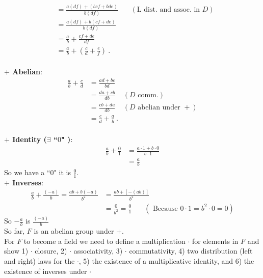 \begin{theorem}
\begin{align}
        &= \frac{a(df)+(bcf+bde)}{b(df)} \ \ \ \ \ \  \ \ (\text{L dist. and assoc. in }D) \nonumber \\
        &= \frac{a(df)+b(cf+de)}{b(df)} \nonumber \\
        &= \frac{a}{b} + \frac{cf+de}{df} \nonumber \\
        &= \frac{a}{b}+\left(\frac{c}{d}+\frac{e}{f}\right) \ . \nonumber
    \end{align}\\
    \newpage 
    \noindent \textbf{$+$ Abelian}: \\
    \begin{align}
        \frac{a}{b}+\frac{c}{d}&= \frac{ad+bc}{bd}\nonumber \\
        &= \frac{da+cb}{db} \ \ \ \ \ (D \text{ comm.}) \nonumber \\
        &= \frac{cb+da}{db} \ \ \ \ \ (D \text{ abelian under }+) \nonumber \\
        &= \frac{c}{d}+\frac{a}{b} \ . \nonumber
    \end{align}\\
    \noindent \textbf{$+$ Identity ($\exists$ ``$0$" )}: \\
    \begin{align}
        \frac{a}{b}+\frac{0}{1} &= \frac{a\cdot 1 + b\cdot 0}{b\cdot 1} \nonumber \\
        &= \frac{a}{b} \nonumber
    \end{align}
    So we have a ``$0$" it is $\frac{0}{1}$.\\
    \noindent \textbf{$+$ Inverses}: \\
    \begin{align}
        \frac{a}{b}+\frac{(-a)}{b} = \frac{ab+b(-a)}{b^2} &= \frac{ab+[-(ab)]}{b^2} \nonumber \\
        &= \frac{0}{b^2} = \frac{0}{1} \ \ \ \ \ \ \ \ (\text{ Because }0\cdot 1 = b^2 \cdot 0 = 0) \nonumber
    \end{align}
    So $-\frac{a}{b}$ is $\frac{(-a)}{b}$
    \steezybreak \\
    So far, $F$ is an abelian group under $+$.  \steezybreak \\
    For $F$ to become a field we need to define a multiplication $\cdot$ for elements in $F$ and
    show 1) $\cdot$ closure, 2) $\cdot$ associativity, 3) $\cdot$ commutativity, 4) two distribution
    (left and right) laws for the $\cdot$, 5) the existence of a multiplicative identity, and 6) the
    existence of inverses under $\cdot$ \steezybreak \\

\end{theorem}
